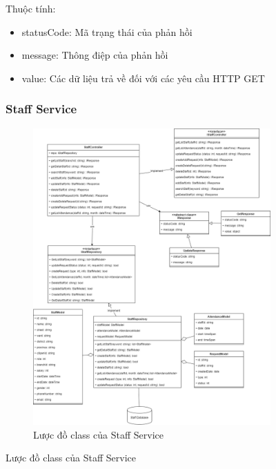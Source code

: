 \begin{figure}[!htp]
Thuộc tính:
\begin{itemize}
	\item statusCode: Mã trạng thái của phản hồi
	\item message: Thông điệp của phản hồi
	\item value: Các dữ liệu trả về đối với các yêu cầu HTTP GET
\end{itemize}



\subsubsection{Staff Service}
\begin{figure}[!htp]
	\centering
	\includegraphics[width=11cm]{img/Architecture/service/StaffService.png}
	\newline
	\caption{Lược đồ class của Staff Service}
\end{figure}


\end{figure}
